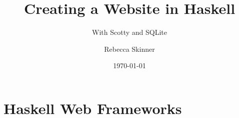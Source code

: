 \documentclass{beamer}
\title{Creating a Website in Haskell}
\subtitle{\small{With Scotty and SQLite}}
\author{Rebecca Skinner}
\date{\today}
\begin{document}
\begin{frame}
  \titlepage{}
\end{frame}

\section{Haskell Web Frameworks}
\end{document}
